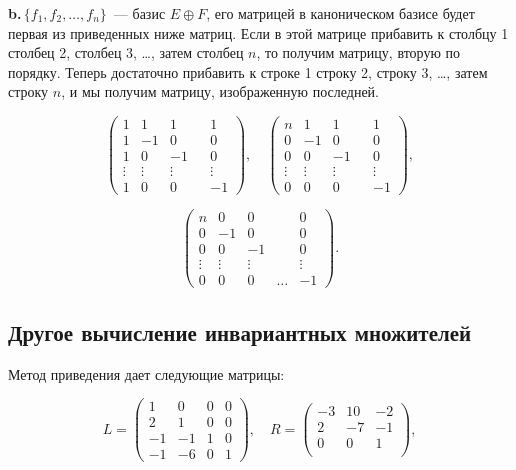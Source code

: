 \documentclass{../../template/mai_book}
\begin{document}
    {\bfseries b.\;}\,$\{f_1, f_2, \ldots, f_n\}$~— базис $E \oplus F$, его матрицей в каноническом базисе будет первая из приведенных ниже матриц. Если в этой матрице прибавить к столбцу 1 столбец 2, столбец 3, \ldots, затем столбец $n$, то получим матрицу, вторую по порядку. Теперь достаточно прибавить к строке 1 строку 2, строку 3, \ldots, затем строку $n$, и мы получим матрицу, изображенную последней.

    \[ \begin{pmatrix}
    1 & 1 & 1 && 1\\
    1 & -1 & 0 && 0\\
    1 & 0 & -1 && 0\\
    \vdots & \vdots & \vdots && \vdots\\
    1 & 0 & 0 && -1
    \end{pmatrix},\quad
    \begin{pmatrix}
    n & 1 & 1 && 1\\
    0 & -1 & 0 && 0\\
    0 & 0 & -1 && 0\\
    \vdots & \vdots & \vdots && \vdots\\
    0 & 0 & 0 && -1
    \end{pmatrix},
    \]

    \[ \begin{pmatrix}
    n & 0 & 0 && 0\\
    0 & -1 & 0 && 0\\
    0 & 0 & -1 && 0\\
    \vdots & \vdots & \vdots && \vdots\\
    0 & 0 & 0 & \dots & -1
    \end{pmatrix}
    .\]

    \newpage

    \subsection{\normalsize{Другое вычисление инвариантных множителей}}

    Метод приведения дает следующие матрицы:

    \[ L = \begin{pmatrix}
    1 & 0 & 0 & 0\\
    2 & 1 & 0 & 0\\
    -1 & -1 & 1 & 0\\
    -1 & -6 & 0 & 1
    \end{pmatrix},\quad
    R = \begin{pmatrix}
    -3 & 10 & -2\\
    2 & -7 & -1\\
    0 & 0 & 1\\
    \end{pmatrix},
    \]
\end{document}
